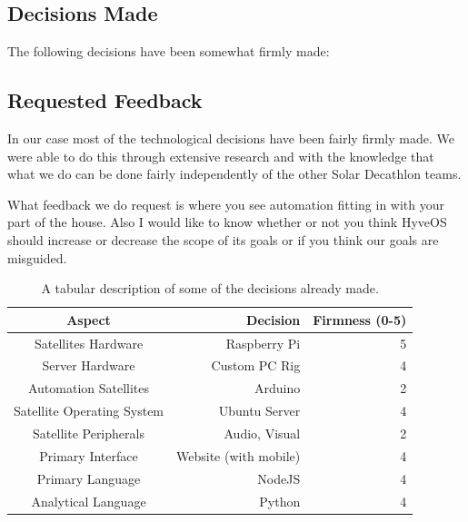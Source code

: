\begin{multicols}{2}
	\subsection{Decisions Made}
	
		The following decisions have been somewhat firmly made:
		
	\subsection{Requested Feedback}
	
		In our case most of the technological decisions have been fairly firmly made.
		We were able to do this through extensive research and with the knowledge that what we do can be done fairly independently of the other Solar Decathlon teams.
		
		What feedback we do request is where you see automation fitting in with your part of the house.
		Also I would like to know whether or not you think HyveOS should increase or decrease the scope of its goals or if you think our goals are misguided.


\end{multicols}
		\begin{table}[h]
			\centering
			\begin{tabular}{c|r|r}
				\toprule
					Aspect & Decision & Firmness (0-5) \\
				\midrule
					Satellites Hardware & Raspberry Pi & 5 \\
					Server Hardware & Custom PC Rig & 4 \\
					Automation Satellites & Arduino & 2 \\
					Satellite Operating System & Ubuntu Server & 4 \\
					Satellite Peripherals & Audio, Visual & 2 \\
					Primary Interface & Website (with mobile) & 4 \\
					Primary Language & NodeJS & 4 \\
					Analytical Language & Python & 4 \\
					\bottomrule
			\end{tabular}
			\label{decision-matrix}
			\caption{A tabular description of some of the decisions already made.}
		\end{table}
